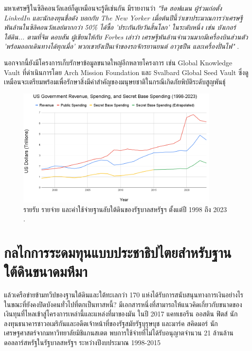 \documentclass[10pt,twocolumn,letterpaper]{article}
\begin{document}
มหาเศรษฐีในซิลิคอนวัลเลย์ก็ดูเหมือนจะรู้ดีเช่นกัน มีรายงานว่า \textit{"รีด ฮอฟแมน ผู้ร่วมก่อตั้ง LinkedIn และนักลงทุนชื่อดัง บอกกับ The New Yorker เมื่อต้นปีนี้ว่าเขาประมาณการว่าเศรษฐีพันล้านในซิลิคอนวัลเลย์มากกว่า 50\% ได้ซื้อ 'ประกันภัยวันสิ้นโลก' ในระดับหนึ่ง เช่น บังเกอร์ใต้ดิน... ตามที่จิม ดอบสัน ผู้เขียนให้กับ Forbes เล่าว่า เศรษฐีพันล้านจำนวนมากมีเครื่องบินส่วนตัว 'พร้อมออกเดินทางได้ทุกเมื่อ' พวกเขายังเป็นเจ้าของรถจักรยานยนต์ อาวุธปืน และเครื่องปั่นไฟ"} \cite{28}.

นอกจากนี้ยังมีโครงการเก็บรักษาข้อมูลขนาดใหญ่อีกหลายโครงการ เช่น Global Knowledge Vault ที่ดำเนินการโดย Arch Mission Foundation \cite{29} และ Svalbard Global Seed Vault \cite{30} ซึ่งดูเหมือนจะเตรียมพร้อมเพื่อรักษาสิ่งมีค่าสำคัญของมนุษยชาติในกรณีเกิดภัยพิบัติระดับสูญพันธุ์
\begin{figure}[t]
\begin{center}
\includegraphics[width=0.9\textwidth]{govcrop2.png}
\end{center}
   \caption{รายรับ รายจ่าย และค่าใช้จ่ายฐานลับใต้ดินของรัฐบาลสหรัฐฯ ตั้งแต่ปี 1998 ถึง 2023 \cite{19}.}
   \label{fig:9}
\end{figure}
\section{กลไกการระดมทุนแบบประชาธิปไตยสำหรับฐานใต้ดินขนาดมหึมา}

แล้วเครือข่ายข้ามทวีปของฐานใต้ดินและใต้ทะเลกว่า 170 แห่งได้รับการสนับสนุนทางการเงินอย่างไร ในขณะที่ยังคงปิดบังคนทั่วไปที่ตกเป็นทาสหนี้? มีเอกสารหนึ่งที่สามารถให้แนวคิดเกี่ยวกับขนาดของเงินทุนที่ไหลเข้าสู่โครงการเหล่านี้และแหล่งที่มาของมัน ในปี 2017 แคทเธอรีน ออสติน ฟิตส์ นักลงทุนธนาคารชาวอเมริกันและอดีตเจ้าหน้าที่ของรัฐสมัยรัฐบุรุษบุช และมาร์ค สคิดมอร์ นักเศรษฐศาสตร์จากมหาวิทยาลัยมิชิแกนสเตต พบการใช้จ่ายที่ไม่ได้รับอนุญาตจำนวน 21 ล้านล้านดอลลาร์สหรัฐในรัฐบาลสหรัฐฯ ระหว่างปีงบประมาณ 1998-2015 \cite{11,12,13}
\end{document}
